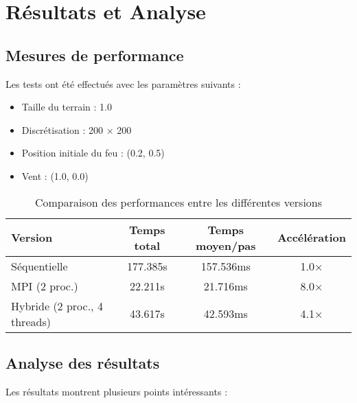 \documentclass[a4paper,12pt]{article}
\begin{document}
\section{Résultats et Analyse}

\subsection{Mesures de performance}

Les tests ont été effectués avec les paramètres suivants :
\begin{itemize}
    \item Taille du terrain : 1.0
    \item Discrétisation : 200 × 200
    \item Position initiale du feu : (0.2, 0.5)
    \item Vent : (1.0, 0.0)
\end{itemize}

\begin{table}[H]
    \centering
    \begin{tabular}{|l|c|c|c|}
        \hline
        \textbf{Version} & \textbf{Temps total} & \textbf{Temps moyen/pas} & \textbf{Accélération} \\
        \hline
        Séquentielle & 177.385s & 157.536ms & 1.0× \\
        \hline
        MPI (2 proc.) & 22.211s & 21.716ms & 8.0× \\
        \hline
        Hybride (2 proc., 4 threads) & 43.617s & 42.593ms & 4.1× \\
        \hline
    \end{tabular}
    \caption{Comparaison des performances entre les différentes versions}
    \label{tab:perf_comparison}
\end{table}

\subsection{Analyse des résultats}

Les résultats montrent plusieurs points intéressants :
\end{document}

